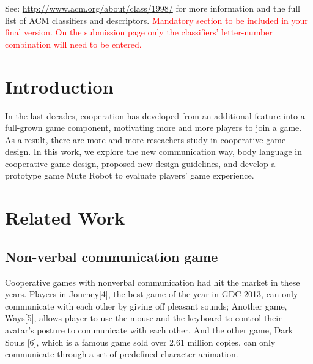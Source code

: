 \documentclass{sigchi}
\begin{document}

See: \url{http://www.acm.org/about/class/1998/}
for more information and the full list of ACM classifiers
and descriptors. 
\textcolor{red}{Mandatory section to be included in your
final version. On the submission page only the classifiers'
letter-number combination will need to be entered.}

\section{Introduction}

In the last decades, cooperation has developed from an additional feature into a full-grown game component, motivating more and more players to join a game. As a result, there are more and more reseachers study in cooperative game design. In this work, we explore the new communication way, body language in cooperative game design,  proposed new design guidelines, and develop a prototype game Mute Robot to evaluate players’ game experience.


\section{Related Work}

\subsection{Non-verbal communication game}

Cooperative games with nonverbal communication had hit the market in these years. Players in Journey[4], the best game of the year in  GDC 2013, can only communicate with each other by giving off pleasant sounds; Another game, Ways[5], allows player to use the mouse and the keyboard to control their avatar’s posture to communicate with each other. And the other game, Dark Souls [6], which is a famous game sold over 2.61 million copies, can only communicate through a set of predefined character animation.
\end{document}
